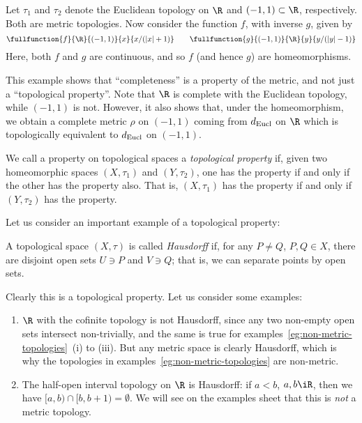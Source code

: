\begin{example}
	Let $\tau_1$ and $\tau_2$ denote the Euclidean topology on $\R$ and $(-1,1) \subset \R$, respectively. Both are metric topologies. Now consider the function $f$, with inverse $g$, given by
	\begin{equation*}
		\fullfunction{f}{\R}{(-1,1)}{x}{x/(\left\vert x \right\vert+1)}
		\qquad
		\fullfunction{g}{(-1,1)}{\R}{y}{y/(\left\vert y \right\vert-1)}
	\end{equation*}
	Here, both $f$ and $g$ are continuous, and so $f$ (and hence $g$) are homeomorphisms.

	This example shows that ``completeness'' is a property of the metric, and not just a ``topological property''. Note that $\R$ is complete with the Euclidean topology, while $(-1,1)$ is not. However, it also shows that, under the homeomorphism, we obtain a complete metric $\rho$ on $(-1,1)$ coming from $d_{\text{Eucl}}$ on $\R$ which is topologically equivalent to $d_{\text{Eucl}}$ on $(-1,1)$.
\end{example}

\begin{definition}
	We call a property on topological spaces a \emph{topological property} if, given two homeomorphic spaces $(X,\tau_1)$ and $(Y,\tau_2)$, one has the property if and only if the other has the property also. That is, $(X,\tau_1)$ has the property if and only if $(Y,\tau_2)$ has the property.
\end{definition}

Let us consider an important example of a topological property:

\begin{definition}
	A topological space $(X,\tau)$ is called \emph{Hausdorff} if, for any $P\neq Q$, $P,Q\in X$, there are disjoint open sets $U\ni P$ and $V\ni Q$; that is, we can separate points by open sets.
\end{definition}

Clearly this is a topological property. Let us consider some examples:

\begin{examples}
\mbox{}
\begin{enumerate}
	\shortskip
	\item $\R$ with the cofinite topology is not Hausdorff, since any two non-empty open sets intersect non-trivially, and the same is true for examples~\ref{eg:non-metric-topologies}~(i) to (iii). But any metric space is clearly Hausdorff, which is why the topologies in examples~\ref{eg:non-metric-topologies} are non-metric.
	\item The half-open interval topology on $\R$ is Hausdorff: if $a<b$, $a,b\iR$, then we have $[a,b) \cap [b,b+1) = \emptyset$. We will see on the examples sheet that this is \emph{not} a metric topology.
\end{enumerate}
\end{examples}

